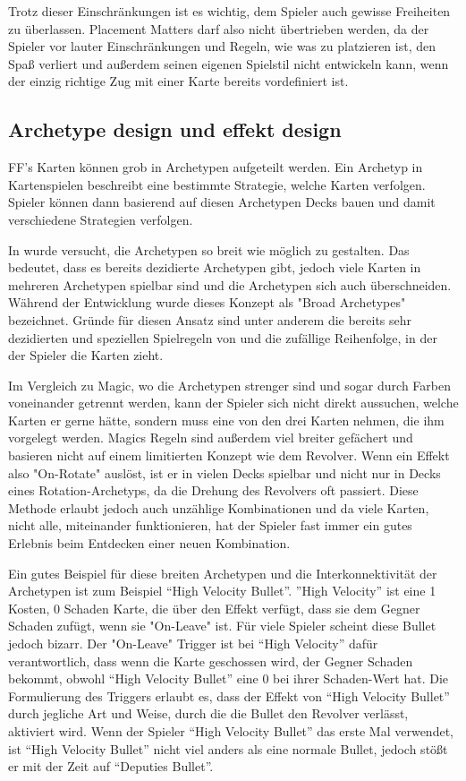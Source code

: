 Trotz dieser Einschränkungen ist es wichtig, dem Spieler auch gewisse Freiheiten zu überlassen. Placement Matters darf
also nicht übertrieben werden, da der Spieler vor lauter Einschränkungen und Regeln, wie was zu platzieren ist, den Spaß
verliert und außerdem seinen eigenen Spielstil nicht entwickeln kann, wenn der einzig richtige Zug mit einer Karte bereits vordefiniert ist.



\subsection{Archetype design und effekt design}\label{subsec:placementMatters}

FF's Karten können grob in Archetypen aufgeteilt werden. Ein Archetyp in Kartenspielen beschreibt eine bestimmte Strategie, welche Karten verfolgen.
Spieler können dann basierend auf diesen Archetypen Decks bauen und damit verschiedene Strategien verfolgen.\cite{whatIsAnArchetype}


In \FF wurde versucht, die Archetypen so breit wie möglich zu gestalten. Das bedeutet, dass es bereits dezidierte Archetypen gibt,
jedoch viele Karten in mehreren Archetypen spielbar sind und die Archetypen sich auch überschneiden.
Während der Entwicklung wurde dieses Konzept als "Broad Archetypes" bezeichnet. Gründe für diesen Ansatz sind unter anderem
die bereits sehr dezidierten und speziellen Spielregeln von \FF und die zufällige Reihenfolge, in der der Spieler die Karten zieht.


Im Vergleich zu Magic, wo die Archetypen strenger sind und sogar durch Farben voneinander getrennt werden,
kann der Spieler sich nicht direkt aussuchen, welche Karten er gerne hätte, sondern muss eine von den drei Karten nehmen,
die ihm vorgelegt werden. Magics Regeln sind außerdem viel breiter gefächert und basieren nicht auf einem limitierten
Konzept wie dem Revolver. Wenn ein Effekt also "On-Rotate" auslöst, ist er in vielen Decks spielbar und nicht nur in Decks
eines Rotation-Archetyps, da die Drehung des Revolvers oft passiert. Diese Methode erlaubt jedoch auch unzählige
Kombinationen und da viele Karten, nicht alle, miteinander funktionieren, hat der Spieler fast immer ein gutes Erlebnis
beim Entdecken einer neuen Kombination.\cite{magicarena}


Ein gutes Beispiel für diese breiten Archetypen und die Interkonnektivität der Archetypen ist zum Beispiel “High Velocity Bullet”.
”High Velocity” ist eine 1 Kosten, 0 Schaden Karte, die über den Effekt verfügt, dass sie dem Gegner Schaden zufügt, wenn sie "On-Leave" ist.
Für viele Spieler scheint diese Bullet jedoch bizarr. Der "On-Leave" Trigger ist bei “High Velocity” dafür verantwortlich,
dass wenn die Karte geschossen wird, der Gegner Schaden bekommt, obwohl “High Velocity Bullet” eine 0 bei ihrer Schaden-Wert hat.
Die Formulierung des Triggers erlaubt es, dass der Effekt von “High Velocity Bullet” durch jegliche Art und Weise, durch
die die Bullet den Revolver verlässt, aktiviert wird. Wenn der Spieler “High Velocity Bullet” das erste Mal verwendet,
ist “High Velocity Bullet” nicht viel anders als eine normale Bullet, jedoch stößt er mit der Zeit auf “Deputies Bullet”.


